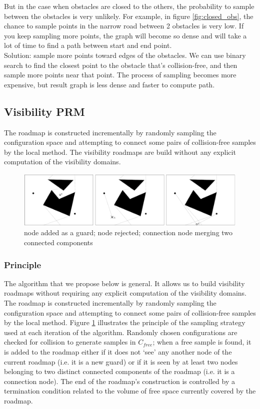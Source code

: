 \documentclass[11pt]{article}
\begin{document}
But in the case when obstacles are closed to the others, the probability to sample between the obstacles is very unlikely. For example, in figure \ref{fig:closed_obs}, the chance to sample points in the narrow road between 2 obstacles is very low. If you keep sampling more points, the graph will become so dense and will take a lot of time to find a path between start and end point.\\
Solution: sample more points toward edges of the obstacles. We can use binary search to find the closest point to the obstacle that's collision-free, and then sample more points near that point. The process of sampling becomes more expensive, but result graph is less dense and faster to compute path.

\subsection{Visibility PRM}
The roadmap is constructed incrementally by randomly sampling the configuration space and attempting to connect some pairs of collision-free samples by the local method.
The visibility roadmaps are build without any explicit computation of the visibility domains.
\begin{figure}[h]
\includegraphics{visibility_psm_visual}
\centering
\caption{node added as a guard; node rejected; connection node merging two connected components}
\label{fig:vispsm_visual}
\end{figure}

\subsubsection{Principle}
The algorithm that we propose below is general. It allows us to build visibility
roadmaps without requiring any explicit computation of the visibility domains.
The roadmap is constructed incrementally by randomly sampling the configuration
space and attempting to connect some pairs of collision-free samples by the
local method. Figure \ref{fig:vispsm_visual} illustrates the principle of the sampling strategy used at
each iteration of the algorithm. Randomly chosen configurations are checked for
collision to generate samples in $C_{free}$; when a free sample is found, it is added to
the roadmap either if it does not ‘see’ any another node of the current roadmap (i.e.
it is a new guard) or if it is seen by at least two nodes belonging to two distinct
connected components of the roadmap (i.e. it is a connection node). The end of
the roadmap’s construction is controlled by a termination condition related to the
volume of free space currently covered by the roadmap.
\end{document}
